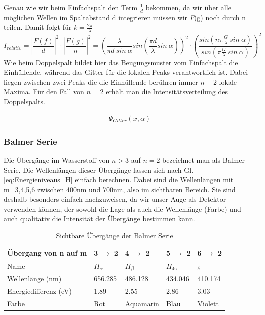 \documentclass[]{article}
\begin{document}
Genau wie wir beim Einfachspalt den Term $\frac{1}{d}$ bekommen, da wir über alle möglichen Wellen im Spaltabstand d integrieren müssen wir \textit{F}(g) noch durch n teilen. 
Damit folgt für $k=\frac{2\pi}{\lambda}$
\begin{equation}
	I_{relativ}=\left|\frac{F(f) }{d}\right|^2\cdot\left|\frac{F(g)}{n}\right|^2=\left(\frac{\lambda}{\pi d \ sin \ \alpha}sin \left(\frac{\pi d}{\lambda}sin \ \alpha\right)\right)^2\cdot\left(\frac{sin \left(n \pi \frac{G}{\lambda} \ sin \ \alpha \right)}{sin \left(\pi \frac{G}{\lambda} \ sin \ \alpha\right)}\right)^2
\end{equation}
Wie beim Doppelspalt bildet hier das Beugungsmuster vom Einfachspalt die Einhüllende, während das Gitter für die lokalen Peaks verantwortlich ist. Dabei liegen zwischen zwei Peaks die die Einhüllende berühren immer $n-2$ lokale Maxima. Für den Fall von $n=2$ erhält man die Intensitätsverteilung des Doppelspalts.

\begin{align}
	\Psi_{Gitter}(x,\alpha)
\end{align}


\subsubsection{Balmer Serie}
Die Übergänge im Wasserstoff von $n>3$ auf $n=2$ bezeichnet man als Balmer Serie. Die Wellenlängen dieser Übergänge lassen sich nach Gl. \ref{eq:Energieniveaus_H} einfach berechnen. Dabei sind die Wellenlängen mit m=3,4,5,6 zwischen 400nm und 700nm, also im sichtbaren Bereich. Sie sind deshalb besonders einfach nachzuweisen, da wir unser Auge als Detektor verwenden können, der sowohl die Lage als auch die Wellenlänge (Farbe) und auch qualitativ die Intensität der Übergänge bestimmen kann.
\begin{table}[H]
	\centering
	\caption{Sichtbare Übergänge der Balmer Serie}
	\label{my-label}
	\begin{tabular}{|l|l|l|l|l|}
		\hline
		Übergang von n auf m  & 3 $\rightarrow$  2 & 4 $\rightarrow$ 2 & 5 $\rightarrow$ 2 & 6 $  \rightarrow$ 2 \\ \hline
		Name                  & $H_{\alpha }$      & $H_{\beta}$        & $H_{4\gamma }$      & $_{\delta}$       \\ \hline
		Wellenlänge (nm)      & 656.285                      & 486.128                      & 434.046                       & 410.174                        \\ \hline
		Energiedifferenz (eV) & 1.89                           & 2.55                           & 2.86                           & 3.03                           \\ \hline
		Farbe                 & Rot                            & Aquamarin                      & Blau                           & Violett                        \\ \hline

	\end{tabular}
\end{table}
\end{document}
